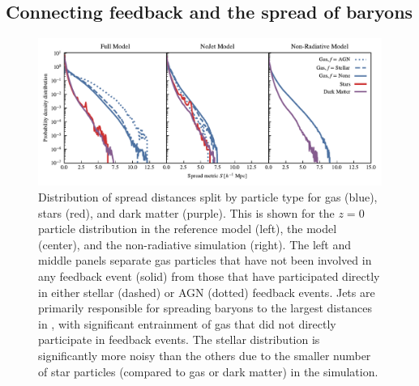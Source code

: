 \subsection{Connecting feedback and the spread of baryons}
\label{sec:fullmodelfeedback}

\begin{figure}
    \centering
    \includegraphics[width=\textwidth]{figures/neighbour_analysis_feedback_histogram_combined.pdf}
    \vspace{-0.7cm}
    \caption{Distribution of spread distances split by particle type for gas
    (blue), stars (red), and dark matter (purple). This is shown for the
    $z=0$ particle distribution in the reference model (left), the \nojet{}
    model (center), and the non-radiative simulation (right). The left and
    middle panels separate gas particles that have not been involved in any
    feedback event (solid) from those that have participated directly in
    either stellar (dashed) or AGN (dotted) feedback events. Jets are
    primarily responsible for spreading baryons to the largest distances in
    \simba{}, with significant entrainment of gas that did not directly
    participate in feedback events. The stellar distribution is significantly
    more noisy than the others due to the smaller number of star particles
    (compared to gas or dark matter) in the simulation.
    }\label{fig:feedbackdistance}
\end{figure}

